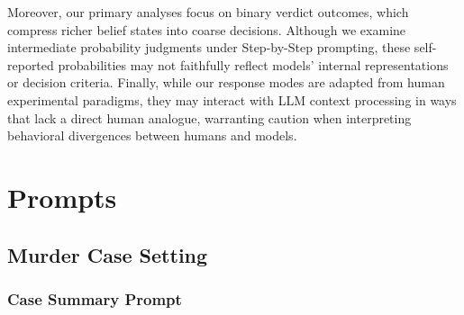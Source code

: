 \documentclass[11pt, letterpaper]{article}
\begin{document}
Moreover, our primary analyses focus on binary verdict outcomes, which compress richer belief states into coarse decisions. Although we examine intermediate probability judgments under Step-by-Step prompting, these self-reported probabilities may not faithfully reflect models’ internal representations or decision criteria. Finally, while our response modes are adapted from human experimental paradigms, they may interact with LLM context processing in ways that lack a direct human analogue, warranting caution when interpreting behavioral divergences between humans and models.



\newpage
\onecolumn
\appendix
\section{Prompts}

\subsection{Murder Case Setting}
\subsubsection{Case Summary Prompt}
\end{document}
